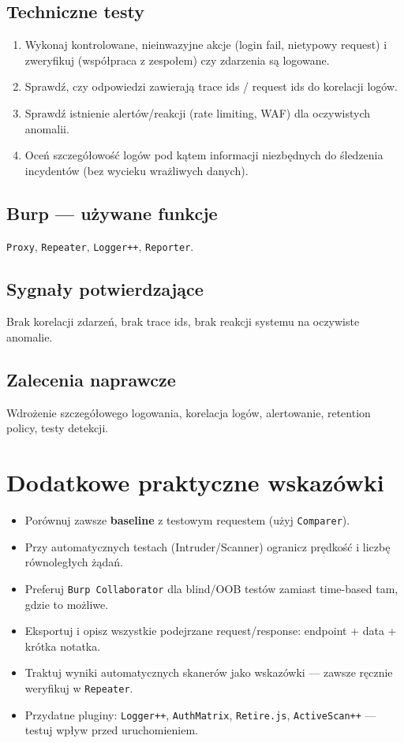 \documentclass[11pt,a4paper]{article}
\begin{document}
	\subsection*{Techniczne testy}
	\begin{enumerate}[leftmargin=*,label=\arabic*)]
		\item Wykonaj kontrolowane, nieinwazyjne akcje (login fail, nietypowy request) i zweryfikuj (współpraca z zespołem) czy zdarzenia są logowane.
		\item Sprawdź, czy odpowiedzi zawierają trace ids / request ids do korelacji logów.
		\item Sprawdź istnienie alertów/reakcji (rate limiting, WAF) dla oczywistych anomalii.
		\item Oceń szczegółowość logów pod kątem informacji niezbędnych do śledzenia incydentów (bez wycieku wrażliwych danych).
	\end{enumerate}
	
	\subsection*{Burp --- używane funkcje}
	\texttt{Proxy}, \texttt{Repeater}, \texttt{Logger++}, \texttt{Reporter}.
	
	\subsection*{Sygnały potwierdzające}
	Brak korelacji zdarzeń, brak trace ids, brak reakcji systemu na oczywiste anomalie.
	
	\subsection*{Zalecenia naprawcze}
	Wdrożenie szczegółowego logowania, korelacja logów, alertowanie, retention policy, testy detekcji.
	
	\newpage
	\section*{Dodatkowe praktyczne wskazówki}
	\begin{itemize}[leftmargin=*]
		\item Porównuj zawsze \textbf{baseline} z testowym requestem (użyj \texttt{Comparer}).
		\item Przy automatycznych testach (Intruder/Scanner) ogranicz prędkość i liczbę równoległych żądań.
		\item Preferuj \texttt{Burp Collaborator} dla blind/OOB testów zamiast time-based tam, gdzie to możliwe.
		\item Eksportuj i opisz wszystkie podejrzane request/response: endpoint + data + krótka notatka.
		\item Traktuj wyniki automatycznych skanerów jako wskazówki — zawsze ręcznie weryfikuj w \texttt{Repeater}.
		\item Przydatne pluginy: \texttt{Logger++}, \texttt{AuthMatrix}, \texttt{Retire.js}, \texttt{ActiveScan++} — testuj wpływ przed uruchomieniem.
	\end{itemize}
	
\end{document}
